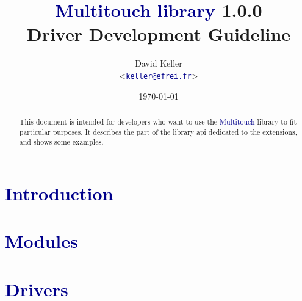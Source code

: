 \documentclass{report}
\begin{document}
%
%
\title
{
    \textcolor{darkblue}{Multitouch library} 1.0.0 \\
    \textbf{Driver Development Guideline}
}
\author
{
    David Keller \\ 
    \textless\textcolor{darkblue}{\texttt{keller@efrei.fr}}\textgreater
}
\date{\today}
\maketitle

%
%
\begin{abstract}
This document is intended for developers who want to use the 
\textcolor{darkblue}{Multitouch} library to fit particular purposes.
It describes the part of the library api dedicated to the extensions,
and shows some examples.
\end{abstract}

%
%
\tableofcontents
\pagestyle{headings}

%
%
\part{\textcolor{darkblue}{Introduction}}


\part{\textcolor{darkblue}{Modules}}


\part{\textcolor{darkblue}{Drivers}}




\lstlistoflistings
\end{document}
